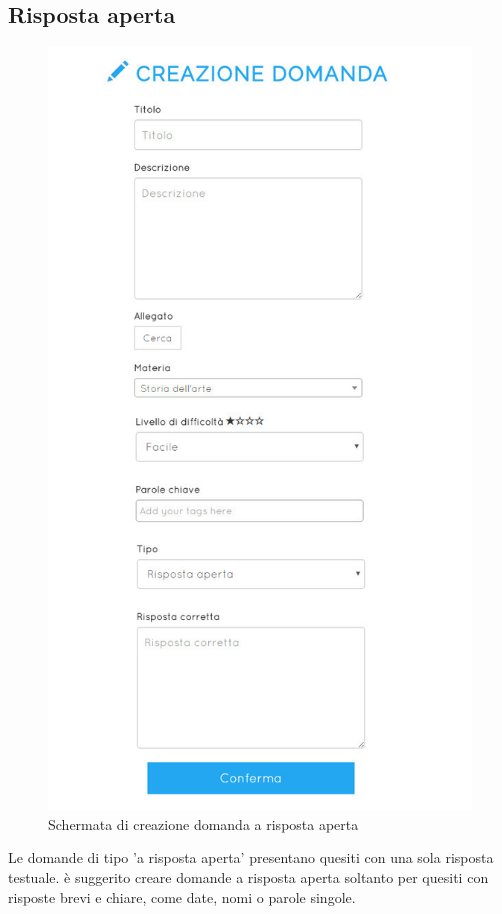 \documentclass[a4paper, titlepage]{article}
\begin{document}
	 \subsection{Risposta aperta}
	 \begin{figure}[!h]
	 	\centering
	 	\includegraphics[scale=0.33]{Img/screen_CreazioneDomandaAperta.png}
	 	\caption{Schermata di creazione domanda a risposta aperta}
	 \end{figure}
	 Le domande di tipo 'a risposta aperta' presentano quesiti con una sola risposta testuale. è suggerito creare domande a risposta aperta soltanto per quesiti con risposte brevi e chiare, come date, nomi o parole singole. 
\end{document}
